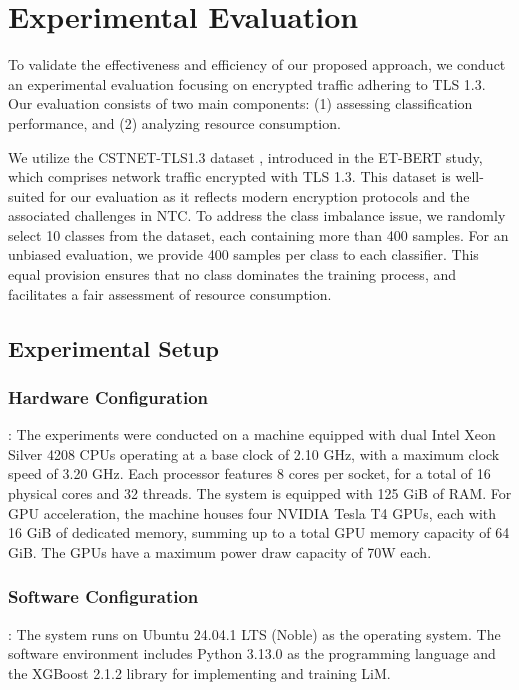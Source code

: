 \section{Experimental Evaluation}
To validate the effectiveness and efficiency of our proposed approach, we conduct an experimental evaluation focusing on encrypted traffic adhering to TLS 1.3. Our evaluation consists of two main components: (1) assessing classification performance, and (2) analyzing resource consumption.

We utilize the CSTNET-TLS1.3 dataset \cite{foundation_et_bert}, introduced in the ET-BERT study, which comprises network traffic encrypted with TLS 1.3. This dataset is well-suited for our evaluation as it reflects modern encryption protocols and the associated challenges in NTC. To address the class imbalance issue, we randomly select 10 classes from the dataset, each containing more than 400 samples. For an unbiased evaluation, we provide 400 samples per class to each classifier. This equal provision ensures that no class dominates the training process, and facilitates a fair assessment of resource consumption.

\subsection{Experimental Setup}
\subsubsection{Hardware Configuration}: The experiments were conducted on a machine equipped with dual Intel Xeon Silver 4208 CPUs operating at a base clock of 2.10 GHz, with a maximum clock speed of 3.20 GHz. Each processor features 8 cores per socket, for a total of 16 physical cores and 32 threads. The system is equipped with 125 GiB of RAM. For GPU acceleration, the machine houses four NVIDIA Tesla T4 GPUs, each with 16 GiB of dedicated memory, summing up to a total GPU memory capacity of 64 GiB. The GPUs have a maximum power draw capacity of 70W each.

\subsubsection{Software Configuration}: The system runs on Ubuntu 24.04.1 LTS (Noble) as the operating system. The software environment includes Python 3.13.0 as the programming language and the XGBoost 2.1.2 library for implementing and training LiM. \\

